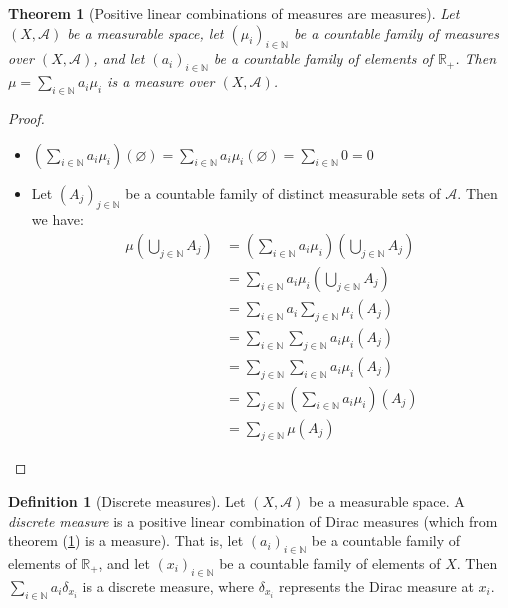 \documentclass{article}
\newtheorem{theorem}{Theorem}[section]
\theoremstyle{definition}
\newtheorem{definition}{Definition}[section]
\theoremstyle{remark}
\theoremstyle{example}
\begin{document}
\begin{theorem}[Positive linear combinations of measures are measures] \label{thm:pos_lin_comb_measures}
    Let $(X, \mathcal{A})$ be a measurable space, let $(\mu_i)_{i \in \mathbb{N}}$ be a countable family of measures over $(X, \mathcal{A})$, and let $(a_i)_{i \in \mathbb{N}}$ be a countable family of elements of $\mathbb{R}_+$. Then $\mu = \sum_{i \in \mathbb{N}} a_i \mu_i$ is a measure over $(X, \mathcal{A})$.
\end{theorem}

\begin{proof}~
    \begin{itemize}
        \item $\left(\sum_{i \in \mathbb{N}} a_i \mu_i\right)(\varnothing) = \sum_{i \in \mathbb{N}} a_i \mu_i(\varnothing) = \sum_{i \in \mathbb{N}} 0 = 0$
        \item Let $(A_j)_{j \in \mathbb{N}}$ be a countable family of distinct measurable sets of $\mathcal{A}$. Then we have:
        \begin{align*}
            \mu(\bigcup_{j \in \mathbb{N}} A_j) &= \left(\sum_{i \in \mathbb{N}} a_i \mu_i\right)(\bigcup_{j \in \mathbb{N}} A_j)\\
            &= \sum_{i \in \mathbb{N}} a_i \mu_i(\bigcup_{j \in \mathbb{N}} A_j)\\
            &= \sum_{i \in \mathbb{N}} a_i \sum_{j \in \mathbb{N}} \mu_i(A_j)\\
            &= \sum_{i \in \mathbb{N}} \sum_{j \in \mathbb{N}} a_i \mu_i(A_j)\\
            &= \sum_{j \in \mathbb{N}} \sum_{i \in \mathbb{N}} a_i \mu_i(A_j)\\
            &= \sum_{j \in \mathbb{N}} \left(\sum_{i \in \mathbb{N}} a_i \mu_i\right)(A_j)\\
            &= \sum_{j \in \mathbb{N}} \mu(A_j)
        \end{align*}
    \end{itemize}
\end{proof}

\begin{definition}[Discrete measures]
    Let $(X, \mathcal{A})$ be a measurable space. A \textit{discrete measure} is a positive linear combination of Dirac measures (which from theorem (\ref{thm:pos_lin_comb_measures}) is a measure). That is, let $(a_i)_{i \in \mathbb{N}}$ be a countable family of elements of $\mathbb{R}_+$, and let $(x_i)_{i \in \mathbb{N}}$ be a countable family of elements of $X$. Then $\sum_{i \in \mathbb{N}} a_i \delta_{x_i}$ is a discrete measure, where $\delta_{x_i}$ represents the Dirac measure at $x_i$.
\end{definition}
\end{document}
